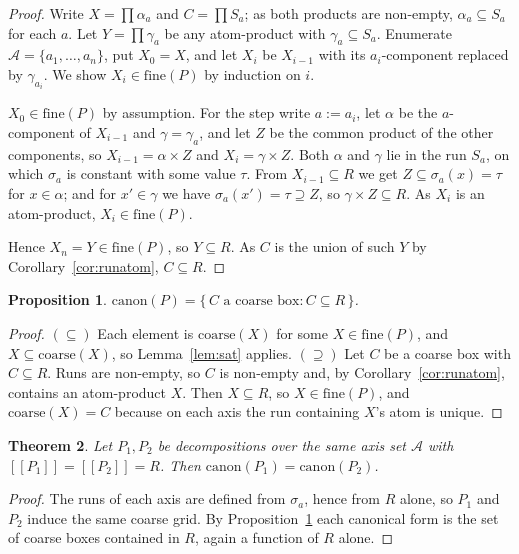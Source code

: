 \documentclass[11pt,a4paper]{article}
\theoremstyle{plain}
\newtheorem{theorem}{Theorem}
\newtheorem{proposition}[theorem]{Proposition}
\theoremstyle{definition}
\theoremstyle{remark}
\newcommand{\sem}[1]{[\![#1]\!]}
\newcommand{\fine}{\mathrm{fine}}
\newcommand{\can}{\mathrm{canon}}
\newcommand{\Ax}{\mathcal{A}}
\begin{document}
\begin{proof}
Write $X = \prod \alpha_a$ and $C = \prod S_a$; as both products are non-empty,
$\alpha_a \subseteq S_a$ for each $a$. Let $Y = \prod \gamma_a$ be any
atom-product with $\gamma_a \subseteq S_a$. Enumerate $\Ax = \{a_1,\dots,a_n\}$,
put $X_0 = X$, and let $X_i$ be $X_{i-1}$ with its $a_i$-component replaced by
$\gamma_{a_i}$. We show $X_i \in \fine(P)$ by induction on $i$.

$X_0 \in \fine(P)$ by assumption. For the step write $a := a_i$, let $\alpha$ be
the $a$-component of $X_{i-1}$ and $\gamma = \gamma_a$, and let $Z$ be the
common product of the other components, so $X_{i-1} = \alpha \times Z$ and
$X_i = \gamma \times Z$. Both $\alpha$ and $\gamma$ lie in the run $S_a$, on
which $\sigma_a$ is constant with some value $\tau$. From $X_{i-1} \subseteq R$
we get $Z \subseteq \sigma_a(x) = \tau$ for $x \in \alpha$; and for $x' \in
\gamma$ we have $\sigma_a(x') = \tau \supseteq Z$, so $\gamma \times Z \subseteq
R$. As $X_i$ is an atom-product, $X_i \in \fine(P)$.

Hence $X_n = Y \in \fine(P)$, so $Y \subseteq R$. As $C$ is the union of such
$Y$ by Corollary~\ref{cor:runatom}, $C \subseteq R$.
\end{proof}

\begin{proposition}\label{prop:charac}
$\can(P) = \{\, C \text{ a coarse box} : C \subseteq R \,\}$.
\end{proposition}

\begin{proof}
$(\subseteq)$ Each element is $\mathrm{coarse}(X)$ for some $X \in \fine(P)$, and
$X \subseteq \mathrm{coarse}(X)$, so Lemma~\ref{lem:sat} applies.
$(\supseteq)$ Let $C$ be a coarse box with $C \subseteq R$. Runs are non-empty,
so $C$ is non-empty and, by Corollary~\ref{cor:runatom}, contains an
atom-product $X$. Then $X \subseteq R$, so $X \in \fine(P)$, and
$\mathrm{coarse}(X) = C$ because on each axis the run containing $X$'s atom is
unique.
\end{proof}

\begin{theorem}\label{thm:B}
Let $P_1, P_2$ be decompositions over the same axis set $\Ax$ with
$\sem{P_1} = \sem{P_2} = R$. Then $\can(P_1) = \can(P_2)$.
\end{theorem}

\begin{proof}
The runs of each axis are defined from $\sigma_a$, hence from $R$ alone, so
$P_1$ and $P_2$ induce the same coarse grid. By Proposition~\ref{prop:charac}
each canonical form is the set of coarse boxes contained in $R$, again a function
of $R$ alone.
\end{proof}
\end{document}
